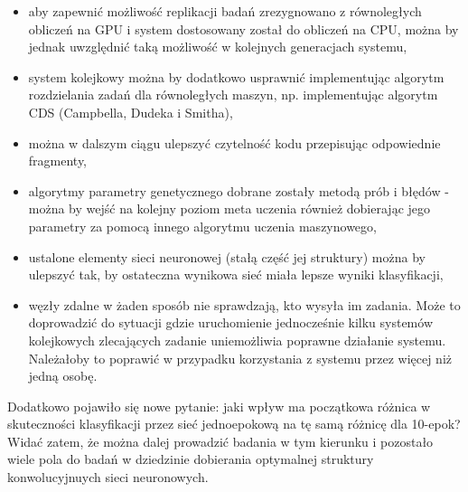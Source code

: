 \begin{itemize}
  \item aby zapewnić możliwość replikacji badań zrezygnowano z równoległych obliczeń na GPU i system dostosowany został do obliczeń na CPU, można by jednak uwzględnić taką możliwość w kolejnych generacjach systemu,
  \item system kolejkowy można by dodatkowo usprawnić implementując algorytm rozdzielania zadań dla równoległych maszyn, np. implementując algorytm CDS (Campbella, Dudeka i Smitha),
  \item można w dalszym ciągu ulepszyć czytelność kodu przepisując odpowiednie fragmenty,
  \item algorytmy parametry genetycznego dobrane zostały metodą prób i błędów - można by wejść na kolejny poziom meta uczenia również dobierając jego parametry za pomocą innego algorytmu uczenia maszynowego,
  \item ustalone elementy sieci neuronowej (stałą część jej struktury) można by ulepszyć tak, by ostateczna wynikowa sieć miała lepsze wyniki klasyfikacji,
  \item węzły zdalne w żaden sposób nie sprawdzają, kto wysyła im zadania.
  Może to doprowadzić do sytuacji gdzie uruchomienie jednocześnie kilku systemów kolejkowych zlecających zadanie uniemożliwia poprawne działanie systemu.
  Należałoby to poprawić w przypadku korzystania z systemu przez więcej niż jedną osobę.
\end{itemize}

Dodatkowo pojawiło się nowe pytanie: jaki wpływ ma początkowa różnica w skuteczności klasyfikacji przez sieć jednoepokową na tę samą różnicę dla 10-epok?
Widać zatem, że można dalej prowadzić badania w tym kierunku i pozostało wiele pola do badań w dziedzinie dobierania optymalnej struktury konwolucyjnuych sieci neuronowych.
